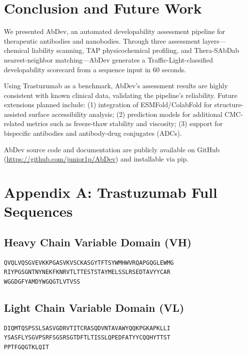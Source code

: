 \documentclass[12pt,a4paper]{article}
\begin{document}
\section{Conclusion and Future Work}

We presented AbDev, an automated developability assessment pipeline for therapeutic antibodies and nanobodies. Through three assessment layers---chemical liability scanning, TAP physicochemical profiling, and Thera-SAbDab nearest-neighbor matching---AbDev generates a Traffic-Light-classified developability scorecard from a sequence input in 60 seconds.

Using Trastuzumab as a benchmark, AbDev's assessment results are highly consistent with known clinical data, validating the pipeline's reliability. Future extensions planned include: (1) integration of ESMFold/ColabFold for structure-assisted surface accessibility analysis; (2) prediction models for additional CMC-related metrics such as freeze-thaw stability and viscosity; (3) support for bispecific antibodies and antibody-drug conjugates (ADCs).

AbDev source code and documentation are publicly available on GitHub (\url{https://github.com/junior1p/AbDev}) and installable via pip.




\newpage
\section*{Appendix A: Trastuzumab Full Sequences}
\subsection*{Heavy Chain Variable Domain (VH)}
\begin{verbatim}
QVQLVQSGVEVKKPGASVKVSCKASGYTFTSYWMHWVRQAPGQGLEWMG
RIYPGSGNTNYNEKFKNRVTLTTESTSTAYMELSSLRSEDTAVYYCAR
WGGDGFYAMDYWGQGTLVTVSS
\end{verbatim}
\subsection*{Light Chain Variable Domain (VL)}
\begin{verbatim}
DIQMTQSPSSLSASVGDRVTITCRASQDVNTAVAWYQQKPGKAPKLLI
YSASFLYSGVPSRFSGSRSGTDFTLTISSLQPEDFATYYCQQHYTTST
PPTFGQGTKLQIT
\end{verbatim}
\end{document}
